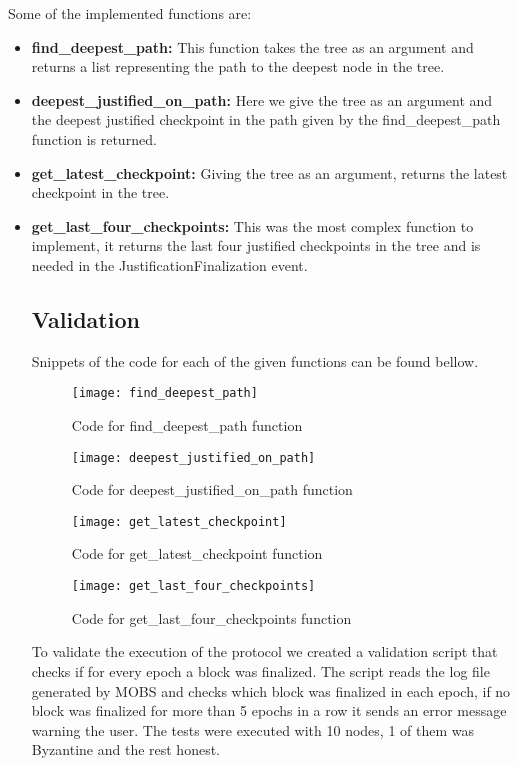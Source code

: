 Some of the implemented functions are:
\begin{itemize}
    \item \textbf{find\_deepest\_path:} This function takes the tree as an argument and returns a list representing the path to the deepest node in the tree.
    \item \textbf{deepest\_justified\_on\_path:} Here we give the tree as an argument and the deepest justified checkpoint in the path given by the
    find\_deepest\_path function is returned.
    \item \textbf{get\_latest\_checkpoint:} Giving the tree as an argument, returns the latest checkpoint in the tree.
    \item \textbf{get\_last\_four\_checkpoints:} This was the most complex function to implement, it returns the last four justified checkpoints in the tree and
    is needed in the JustificationFinalization event.
\subsection{Validation}\label{sub:validation}
Snippets of the code for each of the given functions can be found bellow.

\begin{figure}[h]
	\centering
	\texttt{[image: find\_deepest\_path]}
	\caption{Code for find\_deepest\_path function}
	\label{fig:find_deepest_path}
\end{figure}

\begin{figure}[h]
	\centering
	\texttt{[image: deepest\_justified\_on\_path]}
	\caption{Code for deepest\_justified\_on\_path function}
	\label{fig:deepest_justified_on_path}
\end{figure}

\begin{figure}[h]
	\centering
	\texttt{[image: get\_latest\_checkpoint]}
	\caption{Code for get\_latest\_checkpoint function}
	\label{fig:get_latest_checkpoint}
\end{figure}

\begin{figure}[h]
	\centering
	\texttt{[image: get\_last\_four\_checkpoints]}
	\caption{Code for get\_last\_four\_checkpoints function}
	\label{fig:get_last_four_checkpoints}
\end{figure}

To validate the execution of the protocol we created a validation script that checks if for every epoch a block was finalized.
The script reads the log file generated by MOBS and checks which block was finalized in each epoch, if no block was finalized
for more than 5 epochs in a row it sends an error message warning the user.
The tests were executed with 10 nodes, 1 of them was Byzantine and the rest honest.


\end{itemize}
